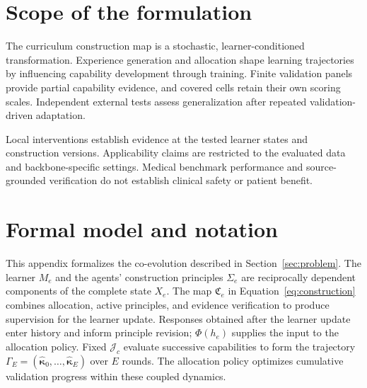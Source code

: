 
\subsection{}
\label{app:revision_followup}


\section{Scope of the formulation}
\label{sec:limitations}

The curriculum construction map is a stochastic, learner-conditioned transformation. Experience generation and allocation shape learning trajectories by influencing capability development through training. Finite validation panels provide partial capability evidence, and covered cells retain their own scoring scales. Independent external tests assess generalization after repeated validation-driven adaptation.

Local interventions establish evidence at the tested learner states and construction versions. Applicability claims are restricted to the evaluated data and backbone-specific settings. Medical benchmark performance and source-grounded verification do not establish clinical safety or patient benefit.

\section{Formal model and notation}
\label{app:formalization}

This appendix formalizes the co-evolution described in Section~\ref{sec:problem}. The learner $M_e$ and the agents' construction principles $\Sigma_e$ are reciprocally dependent components of the complete state $X_e$. The map $\mathfrak C_e$ in Equation~\ref{eq:construction} combines allocation, active principles, and evidence verification to produce supervision for the learner update. Responses obtained after the learner update enter history and inform principle revision; $\Phi(h_e)$ supplies the input to the allocation policy. Fixed $\mathcal J_c$ evaluate successive capabilities to form the trajectory $\Gamma_E=(\widehat{\boldsymbol\kappa}_0,\ldots,\widehat{\boldsymbol\kappa}_E)$ over $E$ rounds. The allocation policy optimizes cumulative validation progress within these coupled dynamics.

